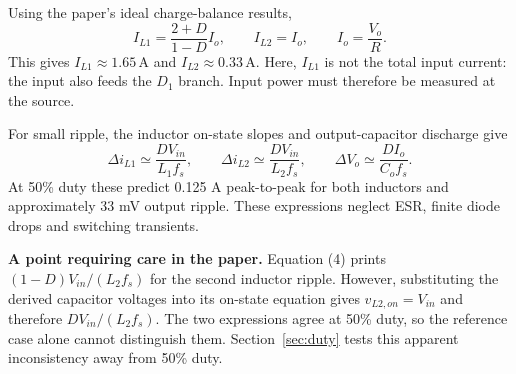 \documentclass[11pt,a4paper]{article}
\newcommand{\unit}[1]{\,\mathrm{#1}}
\begin{document}
Using the paper's ideal charge-balance results,
\begin{equation}
I_{L1}=\frac{2+D}{1-D}I_o,\qquad I_{L2}=I_o,\qquad I_o=\frac{V_o}{R}.
\end{equation}
This gives $I_{L1}\approx1.65\unit{A}$ and $I_{L2}\approx0.33\unit{A}$. Here, $I_{L1}$ is not the total input current: the input also feeds the $D_1$ branch. Input power must therefore be measured at the source.

For small ripple, the inductor on-state slopes and output-capacitor discharge give
\begin{equation}
\Delta i_{L1}\simeq\frac{D V_{in}}{L_1f_s},\qquad
\Delta i_{L2}\simeq\frac{D V_{in}}{L_2f_s},\qquad
\Delta V_o\simeq\frac{D I_o}{C_of_s}.
\end{equation}
At 50\% duty these predict 0.125 A peak-to-peak for both inductors and approximately 33 mV output ripple. These expressions neglect ESR, finite diode drops and switching transients.

\textbf{A point requiring care in the paper.} Equation (4) prints $(1-D)V_{in}/(L_2f_s)$ for the second inductor ripple. However, substituting the derived capacitor voltages into its on-state equation gives $v_{L2,on}=V_{in}$ and therefore $D V_{in}/(L_2f_s)$. The two expressions agree at 50\% duty, so the reference case alone cannot distinguish them. Section~\ref{sec:duty} tests this apparent inconsistency away from 50\% duty.
\clearpage
\end{document}
